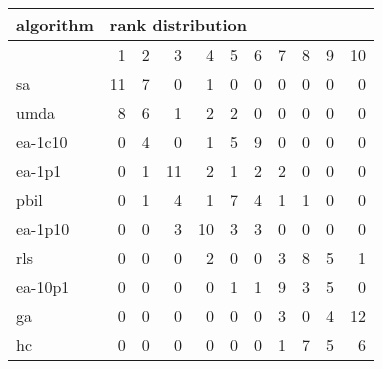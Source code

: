 \begin{tabular}{@{}l*{10}{r}@{}}
\toprule
algorithm & \multicolumn{10}{l}{{rank distribution}}\\
\midrule
& 1 & 2 & 3 & 4 & 5 & 6 & 7 & 8 & 9 & 10\\
\midrule
sa & 11 & 7 & 0 & 1 & 0 & 0 & 0 & 0 & 0 & 0\\
umda & 8 & 6 & 1 & 2 & 2 & 0 & 0 & 0 & 0 & 0\\
ea-1c10 & 0 & 4 & 0 & 1 & 5 & 9 & 0 & 0 & 0 & 0\\
ea-1p1 & 0 & 1 & 11 & 2 & 1 & 2 & 2 & 0 & 0 & 0\\
pbil & 0 & 1 & 4 & 1 & 7 & 4 & 1 & 1 & 0 & 0\\
ea-1p10 & 0 & 0 & 3 & 10 & 3 & 3 & 0 & 0 & 0 & 0\\
rls & 0 & 0 & 0 & 2 & 0 & 0 & 3 & 8 & 5 & 1\\
ea-10p1 & 0 & 0 & 0 & 0 & 1 & 1 & 9 & 3 & 5 & 0\\
ga & 0 & 0 & 0 & 0 & 0 & 0 & 3 & 0 & 4 & 12\\
hc & 0 & 0 & 0 & 0 & 0 & 0 & 1 & 7 & 5 & 6\\
\bottomrule
\end{tabular}
